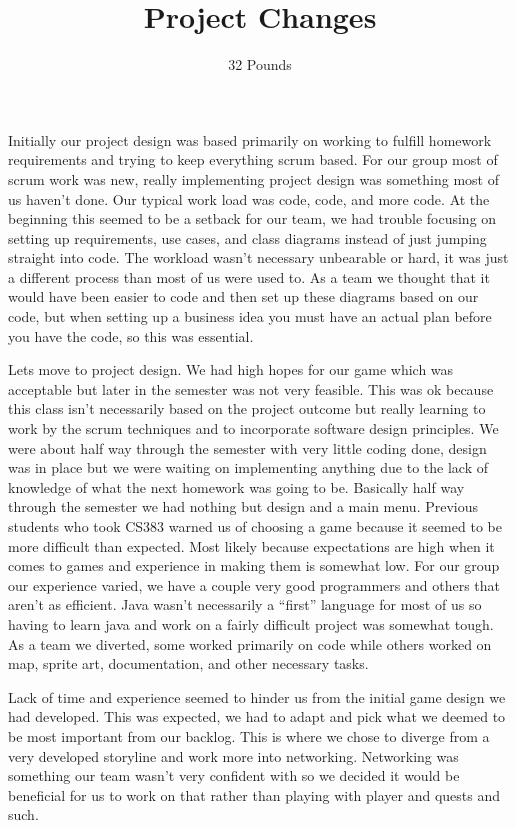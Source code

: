\documentclass{article}
\begin{document}
\title{Project Changes}
\author{32 Pounds}


Initially our project design was based primarily on working to fulfill homework requirements and trying to keep everything scrum based.  For our group most of scrum work was new, really implementing project design was something most of us haven't done.  Our typical work load was code, code, and more code.  At the beginning this seemed to be a setback for our team, we had trouble focusing on setting up requirements, use cases, and class diagrams instead of just jumping straight into code.  The workload wasn't necessary unbearable or hard, it was just a different process than most of us were used to.  As a team we thought that it would have been easier to code and then set up these diagrams based on our code, but when setting up a business idea you must have an actual plan before you have the code, so this was essential.  
 
Lets move to project design.
We had high hopes for our game which was acceptable but later in the semester was not very feasible.  This was ok because this class isn't necessarily based on the project outcome but really learning to work by the scrum techniques and to incorporate software design principles. We were about half way through the semester with very little coding done, design was in place but we were waiting on implementing anything due to the lack of knowledge of what the next homework was going to be. Basically half way through the semester we had nothing but design and a main menu. Previous students who took CS383 warned us of choosing a game because it seemed to be more difficult than expected.  Most likely because expectations are high when it comes to games and experience in making them is somewhat low.  For our group our experience varied, we have a couple very good programmers and others that aren't as efficient.  Java wasn't necessarily a “first” language for most of us so having to learn java and work on a fairly difficult project was somewhat tough.  As a team we diverted, some worked primarily on code while others worked on map, sprite art, documentation, and other necessary tasks.  

Lack of time and experience seemed to hinder us from the initial game design we had developed.  This was expected, we had to adapt and pick what we deemed to be most important from our backlog.  This is where we chose to diverge from a very developed storyline and work more into networking.  Networking was something our team wasn't very confident with so we decided it would be beneficial for us to work on that rather than playing with player and quests and such.
\end{document}
